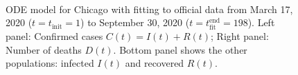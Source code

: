 \documentclass[11pt]{article}
\begin{document}
\begin{figure}
	\centering
	 \\
	\caption{ODE model for Chicago with fitting to official data from March 17, 2020 ($t = t_\text{init} = 1$) to September 30, 2020 ($t = t_\text{fit}^\text{end} = 198$).
		Left panel: Confirmed cases $C(t) = I(t) + R(t)$; Right panel: Number of deaths $D(t)$.
		Bottom panel shows the other populations: infected $I(t)$ and recovered $R(t)$.}
	\label{fig:ode_results}
\end{figure}




\end{document}
